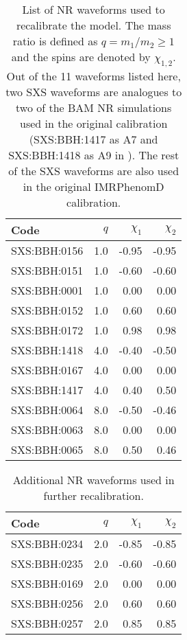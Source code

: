\documentclass[twocolumn]{aastex631}
\begin{document}
\begin{table}[t]
	\centering
	\begin{tabularx}{0.8\columnwidth}{@{\extracolsep{\fill}}lrrr}
		\toprule\midrule Code         & $q$ & $\chi_1$ & $\chi_2$ \\
		\midrule\midrule SXS:BBH:0156 & 1.0 & -0.95    & -0.95    \\
		SXS:BBH:0151 & 1.0 & -0.60    & -0.60    \\
		SXS:BBH:0001 & 1.0 &  0.00    &  0.00    \\
		SXS:BBH:0152 & 1.0 &  0.60    &  0.60    \\
		SXS:BBH:0172 & 1.0 &  0.98    &  0.98    \\
		SXS:BBH:1418 & 4.0 & -0.40    & -0.50    \\
		SXS:BBH:0167 & 4.0 &  0.00    &  0.00    \\
		SXS:BBH:1417 & 4.0 &  0.40    &  0.50    \\
		SXS:BBH:0064 & 8.0 & -0.50    & -0.46    \\
		SXS:BBH:0063 & 8.0 &  0.00    &  0.00    \\
		SXS:BBH:0065 & 8.0 &  0.50    &  0.46    \\ \midrule\bottomrule
	\end{tabularx}
	\caption{List of NR waveforms used to recalibrate the model. The mass ratio is defined as
	$q=m_1/m_2\geq 1$ and the spins are denoted by $\chi_{1,2}$. Out of the 11 waveforms listed
	here, two SXS waveforms are analogues to two of the BAM NR simulations used in the original calibration (SXS:BBH:1417 as A7 and SXS:BBH:1418 as A9 in \citep{khan2016frequency}). The rest of the SXS waveforms are also used in the original IMRPhenomD calibration.}
	\label{tab:q148}
\end{table}
\begin{table}[t]
	\centering
	\begin{tabularx}{0.8\columnwidth}{@{\extracolsep{\fill}}lrrr}
		\toprule\midrule Code         & $q$ & $\chi_1$ & $\chi_2$ \\
		\midrule\midrule SXS:BBH:0234 & 2.0 & -0.85    & -0.85    \\
		SXS:BBH:0235 & 2.0 & -0.60    & -0.60    \\
		SXS:BBH:0169 & 2.0 & 0.00     & 0.00     \\
		SXS:BBH:0256 & 2.0 & 0.60     & 0.60     \\
		SXS:BBH:0257 & 2.0 & 0.85     & 0.85     \\ \midrule\bottomrule
	\end{tabularx}
	\caption{Additional NR waveforms used in further recalibration.}
	\label{tab:q1248}
\end{table}
\end{document}
